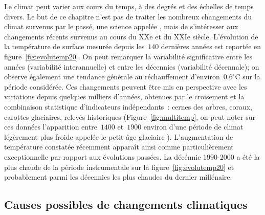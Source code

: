 \sk
Le climat peut varier aux cours du temps, à des degrés et des échelles de temps divers. Le but de ce chapitre n'est pas de traiter les nombreux changements du climat survenus par le passé, une science appelée , mais de s'intéresser aux changements récents survenus au cours du XXe et du XXIe siècle. L'évolution de la température de surface mesurée depuis les~$140$ dernières années est reportée en figure~\ref{fig:evolutemp20}. On peut remarquer la variabilité significative entre les années (variabilité interannuelle) et entre les décennies (variabilité décennale); on observe également une tendance générale au réchauffement d'environ~$0.6^{\circ}$C sur la période considérée. Ces changements peuvent être mis en perspective avec les variations depuis quelques milliers d'années, obtenues par le croisement et la combinaison statistique d'indicateurs indépendants~: cernes des arbres, coraux, carottes glaciaires, relevés historiques (Figure~\ref{fig:multitemp}, on peut noter sur ces données l'apparition entre~$1400$ et~$1900$ environ d'une période de climat légèrement plus froide appelée le \og petit âge glaciaire \fg). L'augmentation de température constatée récemment apparaît ainsi comme particulièrement exceptionnelle par rapport aux évolutions passées. La décénnie 1990-2000 a été la plus chaude de la période instrumentale sur la figure~\ref{fig:evolutemp20} et probablement parmi les décennies les plus chaudes du dernier millénaire.


\sk
\subsection{Causes possibles de changements climatiques}

